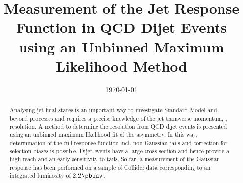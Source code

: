 \documentclass[a4paper]{cmspaper} %
\begin{document}
\begin{titlepage}
  \date{\today}
  \title{Measurement of the Jet \pt Response Function in QCD Dijet
    Events using an Unbinned Maximum Likelihood Method}
  \begin{abstract}
    Analysing jet final states is an important way to investigate
    Standard Model and beyond processes and requires a precise
    knowledge of the jet transverse momentum, \textit{\pt}, resolution.	
    A method to determine the resolution from QCD dijet
    events is presented using an unbinned maximum
    likelihood fit of the \pt asymmetry.
    In this way, determination of the full response function incl. non-Gaussian
    tails and correction for selection biases is possible.
    Dijet events have a large cross section and hence provide a
    high \pt reach and an early sensitivity to tails.
    So far, a measurement of the Gaussian response has been performed
    on a sample of Collider data corresponding to an integrated luminosity of $2.2\pbinv$.
	
  \end{abstract}
\end{titlepage}
\tableofcontents












\end{document}
